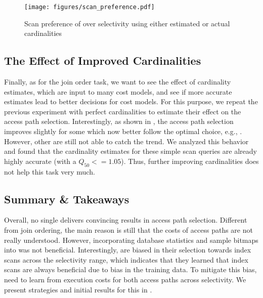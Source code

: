 \begin{figure}
    \centering
    \texttt{[image: figures/scan\_preference.pdf]}
    \caption{Scan preference of \lcms over selectivity using either estimated  or actual cardinalities }
    \label{fig:scan_preference}
\end{figure}

\subsection{The Effect of Improved Cardinalities}
Finally, as for the join order task, we want to see the effect of cardinality estimates, which are input to many cost models, and see if more accurate estimates lead to better decisions for cost models.
For this purpose, we repeat the previous experiment with perfect cardinalities to estimate their effect on the access path selection.
Interestingly, as shown in , the access path selection improves slightly for some \lcm which now better follow the optimal choice, e.g., \flatvector.
However, other \lcms are still not able to catch the trend.
We analyzed this behavior and found that the cardinality estimates for these simple scan queries are already highly accurate (with a $Q_{50} <= 1.05$). 
Thus, further improving cardinalities does not help this task very much.

\subsection{Summary \& Takeaways} \label{sec:access_path_discussion}
Overall, no single \lcm delivers convincing results in access path selection. 
Different from join ordering, the main reason is still that the costs of access paths are not really understood.
However, incorporating database statistics and sample bitmaps into \lcms was not beneficial.
Interestingly, \lcms are biased in their selection towards index scans across the selectivity range, which indicates that they learned that index scans are always beneficial due to bias in the training data.
To mitigate this bias, \lcms need to learn from execution costs for both access paths across selectivity.
We present strategies and initial results for this in .

